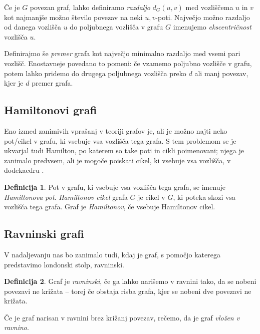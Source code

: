 \documentclass[12pt,a4paper]{amsart}
\theoremstyle{definition} %
\newtheorem{definicija}{Definicija}[section]
\theoremstyle{plain} %
\begin{document}
Če je $G$ povezan graf, lahko definiramo \emph{razdaljo} $d_G(u,v)$ med vozliščema $u$ in $v$ kot najmanjše možno število povezav na neki $u,v$-poti. Največjo možno razdaljo od danega vozlišča $u$ do poljubnega vozlišča v grafu $G$ imenujemo \emph{ekscentričnost} vozlišča $u$.

Definirajmo še \emph{premer} grafa kot največjo minimalno razdaljo med vsemi pari vozlišč. Enostavneje povedano to pomeni: če vzamemo poljubno vozlišče v grafu, potem lahko pridemo do drugega poljubnega vozlišča preko $d$ ali manj povezav, kjer je $d$ premer grafa.

\subsection{Hamiltonovi grafi}

Eno izmed zanimivih vprašanj v teoriji grafov je, ali je možno najti neko pot/cikel v grafu, ki vsebuje vsa vozlišča tega grafa. S tem problemom se je ukvarjal tudi Hamilton, po katerem so take poti in cikli poimenovani; njega je zanimalo predvsem, ali je mogoče poiskati cikel, ki vsebuje vsa vozlišča, v dodekaedru \cite{bib:wikihamilpath}.

\begin{definicija}
	Pot v grafu, ki vsebuje vsa vozlišča tega grafa, se imenuje \emph{Hamiltonova pot}.
	\emph{Hamiltonov cikel} grafa $G$ je cikel v $G$, ki poteka skozi vsa vozlišča tega grafa.
	Graf je \emph{Hamiltonov}, če vsebuje Hamiltonov cikel.
\end{definicija}

\subsection{Ravninski grafi}

V nadaljevanju nas bo zanimalo tudi, kdaj je graf, s pomočjo katerega predstavimo londonski stolp, ravninski.

\begin{definicija}
    Graf je \emph{ravninski}, če ga lahko narišemo v ravnini tako, da se nobeni povezavi ne križata -- torej če obstaja risba grafa, kjer se nobeni dve povezavi ne križata.
\end{definicija}

Če je graf narisan v ravnini brez križanj povezav, rečemo, da je graf \emph{vložen v ravnino}.
\end{document}
